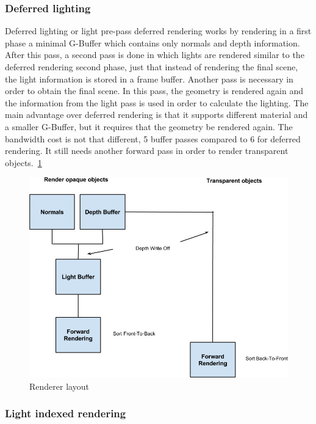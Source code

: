 \subsubsection{Deferred lighting}

Deferred lighting or light pre-pass deferred rendering works by rendering in a first phase a minimal G-Buffer which contains only normals and depth information. After this pass, a second pass is done in which lights are rendered similar to the deferred rendering second phase, just that instead of rendering the final scene, the light information is stored in a frame buffer. 
Another pass is necessary in order to obtain the final scene. In this pass, the geometry is rendered again and the information from the light pass is used in order to calculate the lighting.
The main advantage over deferred rendering is that it supports different material and a smaller G-Buffer, but it requires that the geometry be rendered again. The bandwidth cost is not that different, 5 buffer passes compared to 6 for deferred rendering.
It still needs another forward pass in order to render transparent objects.~\ref{img:lightning1}

\begin{center}
	\begin{figure}[here]
		
		\includegraphics[width=\textwidth]{src/img/lightning1.png}
		\caption{Renderer layout}
		\label{img:lightning1}
	\end{figure}
\end{center}

\subsubsection{Light indexed rendering}

